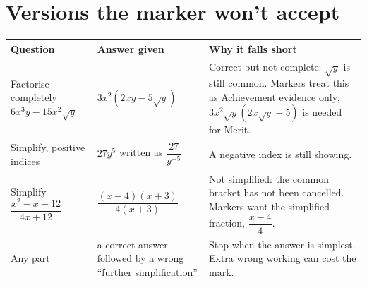 \documentclass[11pt]{article}
\begin{document}
\section{Versions the marker won't accept}\label{h:wontaccept}
\begin{tabularx}{\textwidth}{@{}>{\raggedright}p{} >{\raggedright}p{} X@{}}
\toprule
\textbf{Question} & \textbf{Answer given} & \textbf{Why it falls short} \\ \midrule
Factorise completely $6x^{3}y - 15x^{2}\sqrt{y}$ & $3x^{2}(2xy - 5\sqrt{y})$ & Correct but not complete: $\sqrt{y}$ is still common. Markers treat this as Achievement evidence only; $3x^{2}\sqrt{y}(2x\sqrt{y} - 5)$ is needed for Merit. \tabularnewline
Simplify, positive indices & $27y^{5}$ written as $\dfrac{27}{y^{-5}}$ & A negative index is still showing. \tabularnewline
Simplify $\dfrac{x^{2}-x-12}{4x+12}$ & $\dfrac{(x-4)(x+3)}{4(x+3)}$ & Not simplified: the common bracket has not been cancelled. Markers want the simplified fraction, $\dfrac{x-4}{4}$. \tabularnewline
Any part & a correct answer followed by a wrong ``further simplification'' & Stop when the answer is simplest. Extra wrong working can cost the mark. \tabularnewline
\bottomrule
\end{tabularx}

\end{document}
